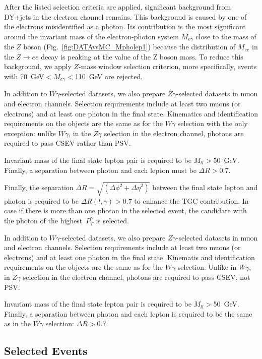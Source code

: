 After the listed selection criteria are applied, significant background from DY+jets in the electron channel remains. This background is caused by one of the electrons misidentified as a photon. Its contribution is the most significant around the invariant mass of the electron-photon system $M_{e\gamma}$ close to the mass of the $Z$ boson (Fig.~\ref{fig:DATAvsMC_Mpholep1}) because the distribution of $M_{ee}$ in the $Z\rightarrow e e$ decay is peaking at the value of the Z boson mass. To reduce this background, we apply $Z$-mass window selection criterion, more specifically, events with 70~GeV$<M_{e\gamma}<$110~GeV are rejected. 

In addition to $W\gamma$-selected datasets, we also prepare $Z\gamma$-selected datasets in muon and electron channels. Selection requirements include at least two muons (or electrons) and at least one photon in the final state. Kinematics and identification requirements on the objects are the same as for the $W\gamma$ selection with the only exception: unlike $W\gamma$, in the $Z\gamma$ selection in the electron channel, photons are required to pass CSEV rather than PSV. 

Invariant mass of the final state lepton pair is required to be $M_{ll}>$50~GeV. Finally, a separation between photon and each lepton must be $\Delta R>$0.7.

Finally, the separation $\Delta R=\sqrt{({\Delta\phi}^2+{\Delta\eta}^2)}$ between the final state lepton and photon is required to be $\Delta R(l,\gamma)>$0.7 to enhance the TGC contribution. In case if there is more than one photon in the selected event, the candidate with the photon of the highest~$P_T^{\gamma}$ is selected. 

In addition to $W\gamma$-selected datasets, we also prepare $Z\gamma$-selected datasets in muon and electron channels. Selection requirements include at least two muons (or electrons) and at least one photon in the final state. Kinematis and identification requirements on the objects are the same as for the $W\gamma$ selection. Unlike in $W\gamma$, in $Z\gamma$ selection in the electron channel, photons are required to pass CSEV, not PSV. 

Invariant mass of the final state lepton pair is required to be $M_{ll}>$50~GeV. Finally, a separation between photon and each lepton is required to be the same as in the $W\gamma$ selection: $\Delta R>$0.7. 

\subsection{Selected Events}

